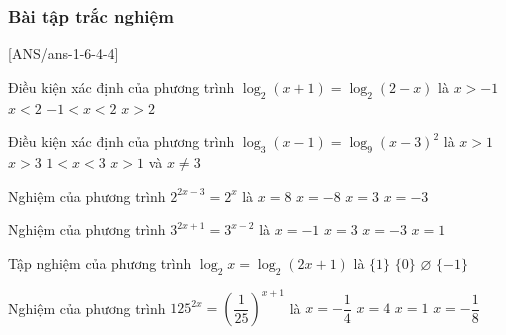 \subsubsection{Bài tập trắc nghiệm}
[ANS/ans-1-6-4-4]
\begin{ex}
	Điều kiện xác định của phương trình $\log_2(x+1)=\log_2(2-x)$ là
	\choice
	{$x>-1$}
	{$x<2$}
	{\True $-1<x<2$}
	{$x>2$}
\end{ex}

\begin{ex}
	Điều kiện xác định của phương trình $\log_3(x-1)=\log_9(x-3)^2$ là
	\choice
	{$x>1$}
	{$x>3$}
	{$1<x<3$}
	{\True $x>1$ và $x\neq 3$}
\end{ex}


\begin{ex}
	Nghiệm của phương trình $2^{2x-3}=2^x$ là
	\choice
	{$x=8$}
	{$x=-8$}
	{\True $x=3$}
	{$x=-3$}
\end{ex}

\begin{ex}
	Nghiệm của phương trình $3^{2x+1}=3^{x-2}$ là
	\choice
	{$x=-1$}
	{$x=3$}
	{\True $x=-3$}
	{$x=1$}
\end{ex}

\begin{ex}
	Tập nghiệm của phương trình $\log_2x=\log_2(2x+1)$ là
	\choice
	{$\{1\}$}
	{$\{0\}$}
	{\True $\varnothing$}
	{$\{-1\}$}
\end{ex}


\begin{ex}
	Nghiệm của phương trình $125^{2x} = \left(\dfrac{1}{25}\right)^{x+1}$ là
	\choice
	{\True $x = -\dfrac{1}{4}$}
	{$x = 4$}
	{$x = 1$}
	{$x= -\dfrac{1}{8}$}
\end{ex}


